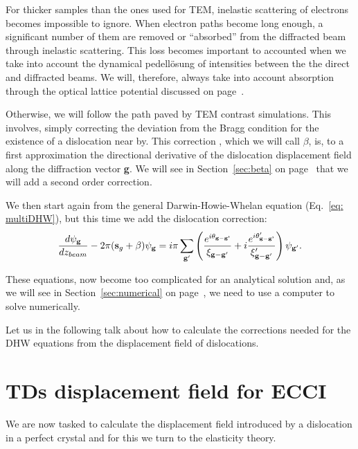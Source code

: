 For thicker samples than the ones used for TEM, inelastic scattering of electrons becomes impossible to ignore.
When electron paths become long enough, a significant number of them are removed or ``absorbed'' from the diffracted beam through inelastic scattering. This loss becomes important to accounted when we take into account the dynamical pedell{\"o}sung of intensities between the the direct and diffracted beams. We will, therefore, always take into account absorption through the optical lattice potential discussed on page~\pageref{sec:absorbtion}.


Otherwise, we will follow the path paved by TEM contrast simulations. This involves, simply correcting the deviation from the Bragg condition for the existence of a dislocation near by. This correction , which we will call $\beta$, is, to a first approximation the directional derivative of the dislocation displacement field along the diffraction vector \textbf{g}. We will see in Section~\ref{sec:beta} on page~\pageref{sec:beta} that we will add a second order correction.  

We then start again from the general Darwin-Howie-Whelan equation (Eq.~\ref{eq: multiDHW}), but this time we add the dislocation  correction:
\begin{equation}
\label{eq: multiDHWTD}
     \frac{d \psi_\mathbf{g}}{dz_{beam}} - 2 \pi  (\vb{s}_g+ \beta) \psi_{\vb{g}} = i \pi \sum_{\vb{g}'} \left( \frac{ e^{i \theta_{\textbf{g}- \textbf{g'}}}}{\xi_{\vb{g}-\vb{g}'}} +i\frac{ e^{i \theta'_{\textbf{g}- \textbf{g'}}}}{\xi'_{\vb{g}-\vb{g}'}}\right) \psi_{\vb{g}'}.
\end{equation}


These equations, now become too complicated for an analytical solution and, as we will see in Section~\ref{sec:numerical} on page~\pageref{sec:numerical},  we need to use a computer to solve numerically. 

Let us in the following talk about how to calculate the corrections needed for the DHW equations from the displacement field of dislocations. 


 \section{TDs displacement field for ECCI}
 \label{sec:strain}


We are now tasked to calculate the displacement field introduced by a dislocation in a perfect crystal and for this we turn to the elasticity theory. 

